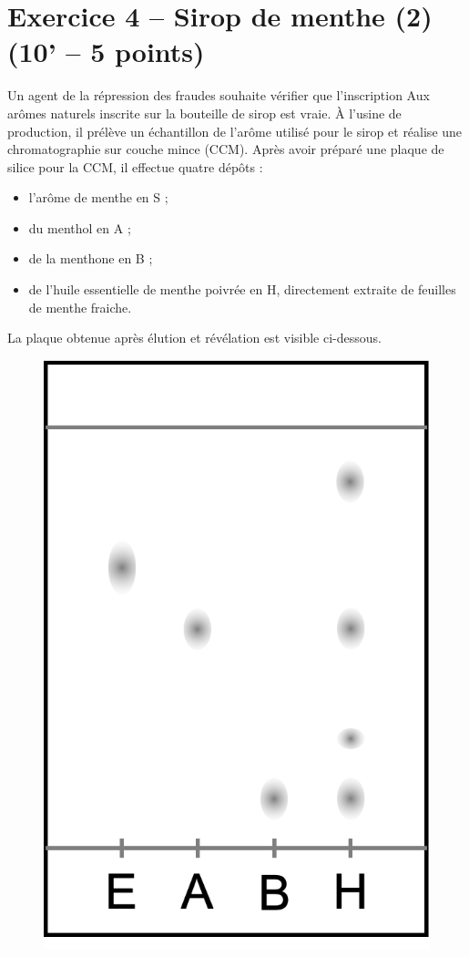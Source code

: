 \section*{Exercice 4 -- Sirop de menthe (2) (10' -- 5 points)}

Un agent de la répression des fraudes souhaite vérifier que l'inscription \og Aux arômes naturels \fg{} inscrite sur la bouteille de sirop est vraie.
À l'usine de production, il prélève un échantillon de l'arôme utilisé pour le sirop et réalise une chromatographie sur couche mince (CCM).
Après avoir préparé une plaque de silice pour la CCM, il effectue quatre dépôts :
\begin{itemize}
\item l'arôme de menthe en S ;
\item du menthol en A ;
\item de la menthone en B ;
\item de l'huile essentielle de menthe poivrée en H, directement extraite de feuilles de menthe fraiche.
\end{itemize}
La plaque obtenue après élution et révélation est visible ci-dessous.
\begin{figure}[h]
\center
\includegraphics[scale=0.5]{../images/ccm_menthe.png}
\end{figure}

